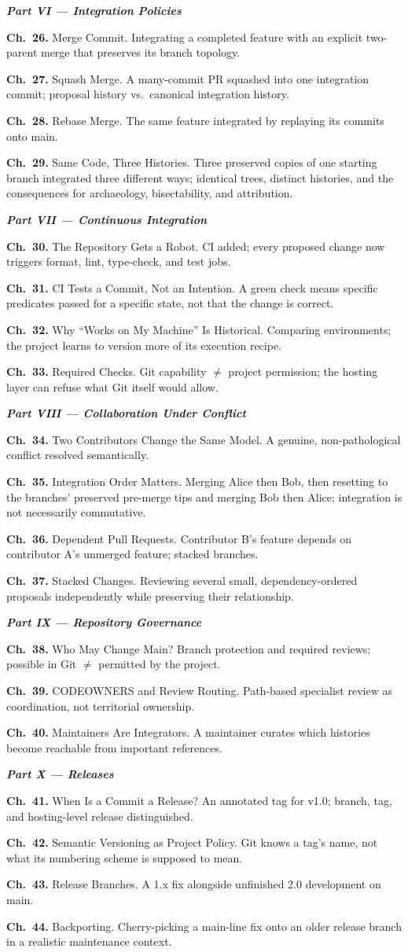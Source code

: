 \documentclass[11pt]{book}
\newcommand{\chapentry}[2]{\noindent\textbf{Ch.~#1.} #2\par\smallskip}
\newcommand{\partheading}[1]{\bigskip\noindent\textbf{\textit{#1}}\smallskip\par}
\begin{document}
\partheading{Part VI --- Integration Policies}
\chapentry{26}{Merge Commit. Integrating a completed feature with an explicit two-parent merge that preserves its branch topology.}
\chapentry{27}{Squash Merge. A many-commit PR squashed into one integration commit; proposal history vs.\ canonical integration history.}
\chapentry{28}{Rebase Merge. The same feature integrated by replaying its commits onto main.}
\chapentry{29}{Same Code, Three Histories. Three preserved copies of one starting branch integrated three different ways; identical trees, distinct histories, and the consequences for archaeology, bisectability, and attribution.}

\partheading{Part VII --- Continuous Integration}
\chapentry{30}{The Repository Gets a Robot. CI added; every proposed change now triggers format, lint, type-check, and test jobs.}
\chapentry{31}{CI Tests a Commit, Not an Intention. A green check means specific predicates passed for a specific state, not that the change is correct.}
\chapentry{32}{Why ``Works on My Machine'' Is Historical. Comparing environments; the project learns to version more of its execution recipe.}
\chapentry{33}{Required Checks. Git capability $\neq$ project permission; the hosting layer can refuse what Git itself would allow.}

\partheading{Part VIII --- Collaboration Under Conflict}
\chapentry{34}{Two Contributors Change the Same Model. A genuine, non-pathological conflict resolved semantically.}
\chapentry{35}{Integration Order Matters. Merging Alice then Bob, then resetting to the branches' preserved pre-merge tips and merging Bob then Alice; integration is not necessarily commutative.}
\chapentry{36}{Dependent Pull Requests. Contributor B's feature depends on contributor A's unmerged feature; stacked branches.}
\chapentry{37}{Stacked Changes. Reviewing several small, dependency-ordered proposals independently while preserving their relationship.}

\partheading{Part IX --- Repository Governance}
\chapentry{38}{Who May Change Main? Branch protection and required reviews; possible in Git $\neq$ permitted by the project.}
\chapentry{39}{CODEOWNERS and Review Routing. Path-based specialist review as coordination, not territorial ownership.}
\chapentry{40}{Maintainers Are Integrators. A maintainer curates which histories become reachable from important references.}

\partheading{Part X --- Releases}
\chapentry{41}{When Is a Commit a Release? An annotated tag for v1.0; branch, tag, and hosting-level release distinguished.}
\chapentry{42}{Semantic Versioning as Project Policy. Git knows a tag's name, not what its numbering scheme is supposed to mean.}
\chapentry{43}{Release Branches. A 1.x fix alongside unfinished 2.0 development on main.}
\chapentry{44}{Backporting. Cherry-picking a main-line fix onto an older release branch in a realistic maintenance context.}
\end{document}
